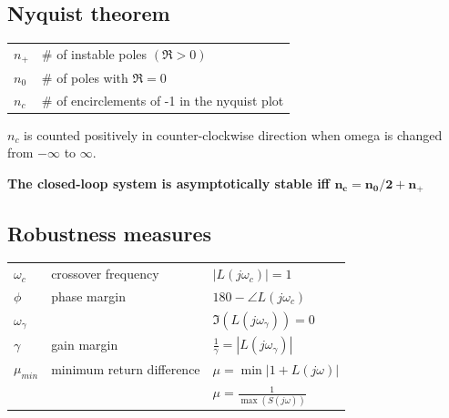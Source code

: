 \documentclass[10pt,a4paper]{scrartcl}
\begin{document}
\begin{multicols*}{3}
	
	
	
	
	\subsection{Nyquist theorem}
	
	\begin{tabular}{l@{= }l}
	$n_+$&$\#$ of instable poles $(\Re>0)$\\
	$n_0$&$\#$ of poles with $\Re = 0$\\
	$n_c$&$\#$ of encirclements of -1 in the nyquist plot\\
	\end{tabular}
	
	\finn	
	
	\small
	$n_c$ is counted positively in counter-clockwise direction when omega is changed from $-\infty$ to $\infty$.	
	\normalsize	
	
	\finn	
	
	\textbf{The closed-loop system is asymptotically stable iff $\mathbf{n_c=n_0/2+n_+}$}
	
	
	
	\subsection{Robustness measures}	
	
	
	\begin{tabular}{lll}
	$\omega_c$&crossover frequency&$|L(j\omega_c)|=1$\\
	$\phi$&phase margin&$180-\angle L(j\omega_c)$\\
	$\omega_{\gamma}$&&$\Im(L(j\omega_\gamma))=0$\\
	$\gamma$&gain margin&$\frac{1}{\gamma}=|L(j\omega_\gamma)|$\\
	$\mu_{min}$&minimum return difference&$\mu=\min|1+L(j\omega)|$\\
	&&$\mu=\frac{1}{\max(S(j\omega))}$\\
	\end{tabular}
	
	

\end{multicols*}
\end{document}
